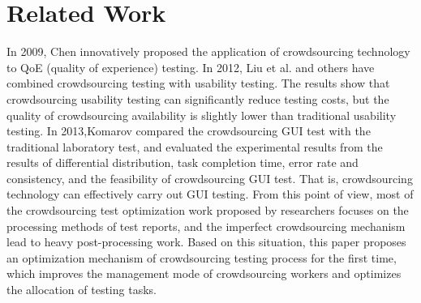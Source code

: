 \section{Related Work}

In 2009, Chen\cite{chen2009crowdsourceable} innovatively proposed the application of crowdsourcing technology to QoE (quality of experience) testing. In 2012, Liu et al.\cite{liu2012crowdsourcing} and others have combined crowdsourcing testing with usability testing. The results show that crowdsourcing usability testing can significantly reduce testing costs, but the quality of crowdsourcing availability is slightly lower than traditional usability testing. In 2013,Komarov\cite{komarov2013crowdsourcing} compared the crowdsourcing GUI test with the traditional laboratory test, and evaluated the experimental results from the results of differential distribution, task completion time, error rate and consistency, and  the feasibility of crowdsourcing GUI test. That is, crowdsourcing technology can effectively carry out GUI testing. From this point of view, most of the crowdsourcing test optimization work proposed by researchers focuses on the processing methods of test reports, and the imperfect crowdsourcing mechanism lead to heavy post-processing work. Based on this situation, this paper proposes an optimization mechanism of crowdsourcing testing process for the first time, which improves the management mode of crowdsourcing workers and optimizes the allocation of testing tasks.


